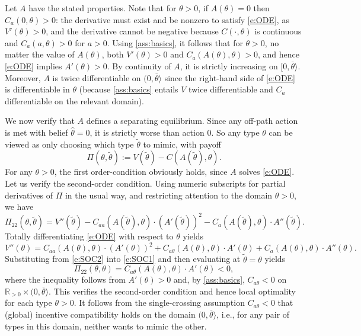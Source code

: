 \documentclass[12 pt]{article}
\makeatletter
\newenvironment{proof}[1][Proof]{\noindent\textbf{#1} }{\ \rule{0.5em}{0.5em}}
\theoremstyle{remark}
\theoremstyle{definition}
\newcommand{\R}{\mathbb{R}}
\newcommand{\Rstrpos}{\R_{>0}}
\def\typemin{0}
\def\typemax{\overline \theta}
\renewenvironment{proof}[1][\proofname] {\par\pushQED{\qed}\normalfont\topsep6\p@\@plus6\p@\relax\trivlist\item[\hskip\labelsep\bfseries#1\@addpunct{.}]\ignorespaces}{\popQED\endtrivlist\@endpefalse}
\makeatother
\begin{document}
\begin{proof}[Proof of \autoref{prop:sufficiency}]
    Let $A$ have the stated properties. Note that for $\theta>\typemin$, if $A(\theta)=0$ then $C_a(0,\theta)>0$: the derivative must exist and be nonzero to satisfy \eqref{e:ODE}, as $V'(\theta)>0$, and the derivative cannot be negative because $C(\cdot,\theta)$ is continuous and $C_a(a,\theta)>0$ for $a>0$. Using \autoref{ass:basics}, it follows that for $\theta>0$, no matter the value of $A(\theta)$, both $V'(\theta)>0$ and $C_a(A(\theta),\theta)>0$, and hence \eqref{e:ODE} implies $A'(\theta)>0$. By continuity of $A$, it is strictly increasing on $[\typemin,\typemax\rangle$. Moreover, $A$ is twice differentiable on $(\typemin, \typemax\rangle$ since the right-hand side of \eqref{e:ODE} is differentiable in $\theta$ (because \autoref{ass:basics} entails $V$ twice differentiable and $C_a$ differentiable on the relevant domain).

    We now verify that $A$ defines a separating equilibrium. Since any off-path action is met with belief $\hat \theta=0$, it is strictly worse than action $0$. So any type $\theta$ can be viewed as only choosing which type $\tilde{\theta}$ to mimic, with payoff 
\[
\Pi(\theta, \tilde{\theta}) := V(\tilde{\theta}) - C(A(\tilde{\theta}), \theta).
\]
For any $\theta>0$, the first order-condition obviously holds, since $A$ solves \eqref{e:ODE}. Let us verify the second-order condition. Using numeric subscripts for partial derivatives of $\Pi$ in the usual way, and restricting attention to the domain $\theta>\typemin$, we have
\begin{equation}
\label{e:SOC1}
\Pi_{22}(\theta,\tilde \theta) = V''(\tilde{\theta}) - C_{aa}(A(\tilde{\theta}), \theta) \cdot (A'(\tilde{\theta}))^2 - C_a(A(\tilde{\theta}), \theta) \cdot A''(\tilde{\theta}).    
\end{equation}
Totally differentiating \eqref{e:ODE} with respect to $\theta$ yields
\begin{equation}
\label{e:SOC2}
V''(\theta) = C_{aa}(A(\theta), \theta) \cdot (A'(\theta))^2 + C_{a \theta}(A(\theta), \theta) \cdot A'(\theta) + C_a(A(\theta), \theta) \cdot A''(\theta).    
\end{equation}
Substituting from \eqref{e:SOC2} into \eqref{e:SOC1} and then evaluating at $\tilde \theta=\theta$ yields
\[
\Pi_{22}(\theta,\theta) = C_{a \theta}(A(\theta), \theta) \cdot A'(\theta) < 0,
\]
where the inequality follows from $A'(\theta) > 0$ and, by \autoref{ass:basics}, $C_{a \theta} < 0$ on $\Rstrpos\times (\typemin,\typemax\rangle$. This verifies the second-order condition and hence local optimality for each type $\theta > \typemin$. It follows from the single-crossing assumption $C_{a \theta} < 0$ that (global) incentive compatibility holds on the domain $(\typemin,\typemax\rangle$, i.e., for any pair of types in this domain, neither wants to mimic the other.


\end{proof}
\end{document}
